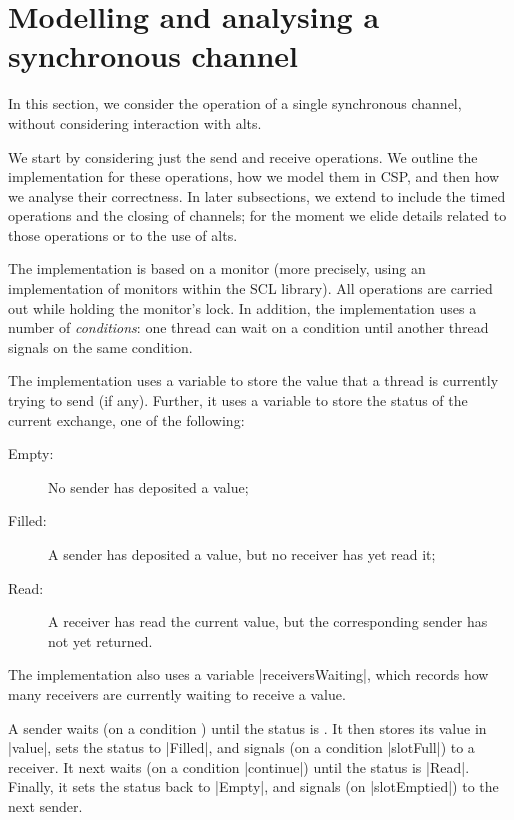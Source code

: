 \section{Modelling and analysing a  synchronous channel}
\label{sec:syncchan}

\inlineScala

In this section, we consider the operation of a single synchronous channel,
without considering interaction with alts.

We start by considering just the send and receive operations.  We outline the
implementation for these operations, how we model them in CSP, and then how we
analyse their correctness.  In later subsections, we extend to include the
timed operations and the closing of channels; for the moment we elide details
related to those operations or to the use of alts.

The implementation is based on a monitor (more precisely, using an
implementation of monitors within the SCL library).  All operations are
carried out while holding the monitor's lock.  In addition, the implementation
uses a number of \emph{conditions}: one thread can wait on a condition until
another thread signals on the same condition.

The implementation uses a variable  to store the value that a
thread is currently trying to send (if any).  Further, it uses a variable
 to store the status of the current exchange, one of the
following: 
\begin{description}
\item[{\scalastyle Empty}:] No sender has deposited a value;
\item[{\scalastyle Filled}:] A sender has deposited a value, but no receiver
  has yet read it;
\item[{\scalastyle Read}:] A receiver has read the current value, but the
  corresponding sender has not yet returned.
\end{description}
%
The implementation also uses a variable |receiversWaiting|, which records how
many receivers are currently waiting to receive a value. 

A sender waits (on a condition ) until the status is
.  It then stores its value in |value|, sets the status to
|Filled|, and signals (on a condition |slotFull|) to a receiver.  It next 
waits (on a condition |continue|) until the status is |Read|.  Finally, it
sets the status back to |Empty|, and signals (on |slotEmptied|) to the next
sender.

